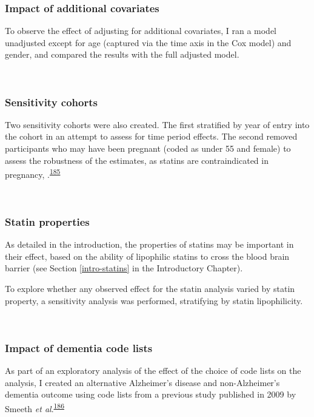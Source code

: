 \documentclass[a4paper, twoside]{templates/ociamthesis}
\begin{document}
\hypertarget{impact-of-additional-covariates}{%
\subsubsection{Impact of additional covariates}\label{impact-of-additional-covariates}}

To observe the effect of adjusting for additional covariates, I ran a model unadjusted except for age (captured via the time axis in the Cox model) and gender, and compared the results with the full adjusted model.

~

\hypertarget{sensitivity-cohorts}{%
\subsubsection{Sensitivity cohorts}\label{sensitivity-cohorts}}

Two sensitivity cohorts were also created. The first stratified by year of entry into the cohort in an attempt to assess for time period effects. The second removed participants who may have been pregnant (coded as under 55 and female) to assess the robustness of the estimates, as statins are contraindicated in pregnancy, .\textsuperscript{\protect\hyperlink{ref-karalis2016}{185}}

~

\hypertarget{statin-properties}{%
\subsubsection{Statin properties}\label{statin-properties}}

As detailed in the introduction, the properties of statins may be important in their effect, based on the ability of lipophilic statins to cross the blood brain barrier (see Section \ref{intro-statins} in the Introductory Chapter).

To explore whether any observed effect for the statin analysis varied by statin property, a sensitivity analysis was performed, stratifying by statin lipophilicity.

~

\hypertarget{impact-of-dementia-code-lists}{%
\subsubsection{Impact of dementia code lists}\label{impact-of-dementia-code-lists}}

As part of an exploratory analysis of the effect of the choice of code lists on the analysis, I created an alternative Alzheimer's disease and non-Alzheimer's dementia outcome using code lists from a previous study published in 2009 by Smeeth \emph{et al}.\textsuperscript{\protect\hyperlink{ref-smeeth2009}{186}}
\end{document}

